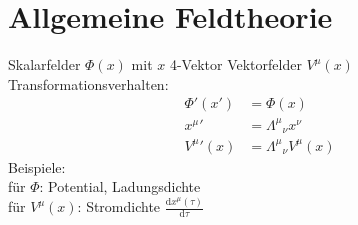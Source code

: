 \documentclass[a4paper]{article}
\begin{document}
\section{Allgemeine Feldtheorie}

Skalarfelder $\Phi(x)$ mit $x$ 4-Vektor
Vektorfelder $V^\mu(x)$
Transformationsverhalten:
\begin{align}
\Phi '(x ')&=\Phi(x) \\
x^\mu {}'&=\Lambda^\mu{}_\nu x^\nu\\
V^\mu {}'(x)&=\Lambda^\mu{}_\nu V^\mu(x)
\end{align}
Beispiele:\\
für $\Phi$: Potential, Ladungsdichte\\
für $V^\mu(x)$: Stromdichte $\frac{\mathrm{d}x^\mu(\tau)}{\mathrm{d}\tau}$\\
\end{document}
